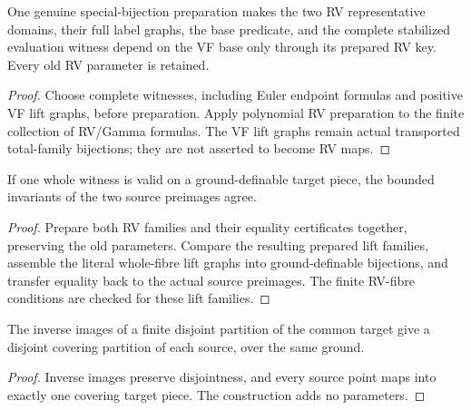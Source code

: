 \begin{lemma}
\label{preparation}
\leanok
{}
One genuine special-bijection preparation makes the two RV representative domains, their full label graphs, the base predicate, and the complete stabilized evaluation witness depend on the VF base only through its prepared RV key. Every old RV parameter is retained.
\end{lemma}

\begin{proof}
Choose complete witnesses, including Euler endpoint formulas and positive VF lift graphs, before preparation. Apply polynomial RV preparation to the finite collection of RV/Gamma formulas. The VF lift graphs remain actual transported total-family bijections; they are not asserted to become RV maps.
\end{proof}

\begin{lemma}
\label{fixed}
\leanok
{}
If one whole witness is valid on a ground-definable target piece, the bounded invariants of the two source preimages agree.
\end{lemma}

\begin{proof}
Prepare both RV families and their equality certificates together, preserving the old parameters. Compare the resulting prepared lift families, assemble the literal whole-fibre lift graphs into ground-definable bijections, and transfer equality back to the actual source preimages. The finite RV-fibre conditions are checked for these lift families.
\end{proof}

\begin{lemma}
\label{preimages}
\leanok
{}
The inverse images of a finite disjoint partition of the common target give a disjoint covering partition of each source, over the same ground.
\end{lemma}

\begin{proof}
Inverse images preserve disjointness, and every source point maps into exactly one covering target piece. The construction adds no parameters.
\end{proof}

